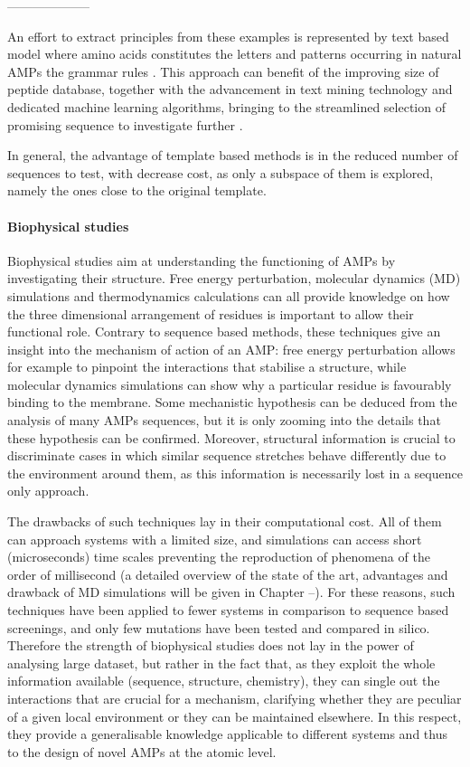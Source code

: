 --------------------




An effort to extract principles from these examples is represented by text based model where amino acids constitutes the letters and patterns occurring in natural AMPs the grammar rules \cite{Loose2006}.
This approach can benefit of the improving size of peptide database, together with the advancement in text mining technology and dedicated machine learning algorithms, bringing to the streamlined selection of promising sequence to investigate further \cite{IBMhttps://doi.org/10.1063/1.5027261}.

In general, the advantage of template based methods is in the reduced number of sequences to test, with decrease cost, as only a subspace of them is explored, namely the ones close to the original template.


\paragraph{Biophysical studies}
Biophysical studies aim at understanding the functioning of AMPs by investigating their structure. Free energy perturbation, molecular dynamics (MD) simulations and thermodynamics calculations can all provide knowledge on how the three dimensional arrangement of residues is important to allow their functional role.
%
Contrary to sequence based methods, these techniques give an insight into the mechanism of action of an AMP: free energy perturbation allows for example to pinpoint the interactions that stabilise a structure, while molecular dynamics simulations can show why a particular residue is favourably binding to the membrane. Some mechanistic hypothesis can be deduced from the analysis of many AMPs sequences, but it is only zooming into the details that these hypothesis can be confirmed. Moreover, structural information is crucial to discriminate cases in which similar sequence stretches behave differently due to the environment around them, as this information is necessarily lost in a sequence only approach.

The drawbacks of such techniques lay in their computational cost. All of them can approach systems with a limited size, and simulations can access short (microseconds) time scales preventing the reproduction of phenomena of the order of millisecond (a detailed overview of the state of the art, advantages and drawback of MD simulations will be given in Chapter --).
%
For these reasons, such techniques have been applied to fewer systems in comparison to sequence based screenings, and only few mutations have been tested and compared in silico.
%
Therefore the strength of biophysical studies does not lay in the power of analysing large dataset, but rather in the fact that, as they exploit the whole information available (sequence, structure, chemistry), they can single out the interactions that are crucial for a mechanism, clarifying whether they are peculiar of a given local environment or they can be maintained elsewhere. In this respect, they provide a generalisable knowledge applicable to different systems and thus to the design of novel AMPs at the atomic level.

